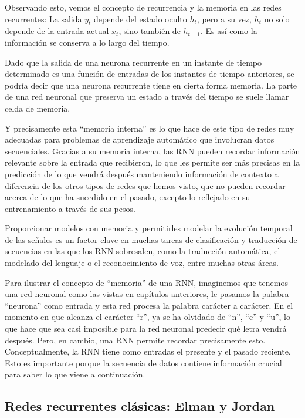 \documentclass[
  a4paper,
  DIV=11,
  numbers=noendperiod]{scrreprt}
\begin{document}
Observando esto, vemos el concepto de recurrencia y la memoria en las
redes recurrentes: La salida \(y_t\) depende del estado oculto \(h_t\),
pero a su vez, \(h_t\) no solo depende de la entrada actual \(x_t\),
sino también de \(h_{t-1}\). Es así como la información se conserva a lo
largo del tiempo.

Dado que la salida de una neurona recurrente en un instante de tiempo
determinado es una función de entradas de los instantes de tiempo
anteriores, se podría decir que una neurona recurrente tiene en cierta
forma memoria. La parte de una red neuronal que preserva un estado a
través del tiempo se suele llamar celda de memoria.

Y precisamente esta ``memoria interna'' es lo que hace de este tipo de
redes muy adecuadas para problemas de aprendizaje automático que
involucran datos secuenciales. Gracias a su memoria interna, las RNN
pueden recordar información relevante sobre la entrada que recibieron,
lo que les permite ser más precisas en la predicción de lo que vendrá
después manteniendo información de contexto a diferencia de los otros
tipos de redes que hemos visto, que no pueden recordar acerca de lo que
ha sucedido en el pasado, excepto lo reflejado en su entrenamiento a
través de sus pesos.

Proporcionar modelos con memoria y permitirles modelar la evolución
temporal de las señales es un factor clave en muchas tareas de
clasificación y traducción de secuencias en las que los RNN sobresalen,
como la traducción automática, el modelado del lenguaje o el
reconocimiento de voz, entre muchas otras áreas.

Para ilustrar el concepto de ``memoria'' de una RNN, imaginemos que
tenemos una red neuronal como las vistas en capítulos anteriores, le
pasamos la palabra ``neurona'' como entrada y esta red procesa la
palabra carácter a carácter. En el momento en que alcanza el carácter
``r'', ya se ha olvidado de ``n'', ``e'' y ``u'', lo que hace que sea
casi imposible para la red neuronal predecir qué letra vendrá después.
Pero, en cambio, una RNN permite recordar precisamente esto.
Conceptualmente, la RNN tiene como entradas el presente y el pasado
reciente. Esto es importante porque la secuencia de datos contiene
información crucial para saber lo que viene a continuación.

\subsection{Redes recurrentes clásicas: Elman y
Jordan}\label{redes-recurrentes-cluxe1sicas-elman-y-jordan}
\end{document}
